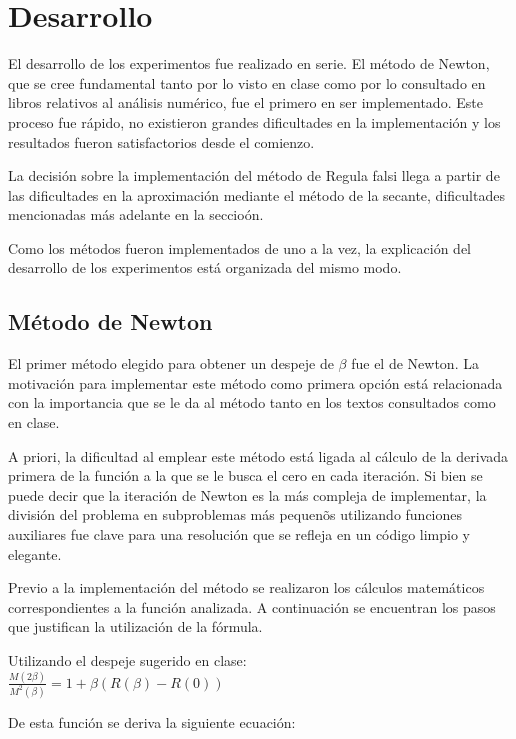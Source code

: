 \section{Desarrollo}

El desarrollo de los experimentos fue realizado en serie. El m\'etodo de Newton, que se cree fundamental tanto por lo 
visto en clase como por lo consultado en libros relativos al an\'alisis num\'erico, fue el primero en ser implementado. 
Este proceso fue r\'apido, no existieron grandes dificultades en la implementaci\'on y los resultados fueron 
satisfactorios desde el comienzo.

La decisi\'on sobre la implementaci\'on del m\'etodo de Regula falsi llega a partir de las dificultades en la 
aproximaci\'on mediante el m\'etodo de la secante, dificultades mencionadas m\'as adelante en la seccio\'on.

Como los m\'etodos fueron implementados de uno a la vez, la explicaci\'on del desarrollo de los experimentos est\'a 
organizada del mismo modo.

\subsection{M\'etodo de Newton}

El primer m\'etodo elegido para obtener un despeje de $\beta$ fue el de Newton. La motivaci\'on para implementar este 
m\'etodo como primera opci\'on est\'a relacionada con la importancia que se le da al m\'etodo tanto en los textos 
consultados como en clase.

A priori, la dificultad al emplear este m\'etodo est\'a ligada al c\'alculo de la derivada primera de la funci\'on a la 
que se le busca el cero en cada iteraci\'on. Si bien se puede decir que la iteraci\'on de Newton es la m\'as compleja 
de implementar, la divisi\'on del problema en subproblemas m\'as pequen\~os utilizando funciones auxiliares fue clave 
para una resoluci\'on que se refleja en un c\'odigo limpio y elegante.

Previo a la implementaci\'on del m\'etodo se realizaron los c\'alculos matem\'aticos correspondientes a la funci\'on 
analizada. A continuaci\'on se encuentran los pasos que justifican la utilizaci\'on de la f\'ormula.

Utilizando el despeje sugerido en clase:\\

$\frac{M(2\beta)}{M^2(\beta)}=1 + \beta(R(\beta)-R(0))$

De esta funci\'on se deriva la siguiente ecuaci\'on: \\

